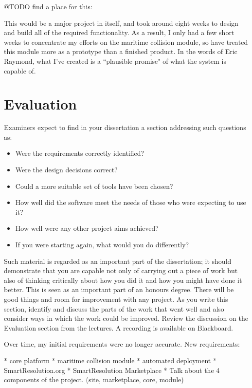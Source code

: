 @TODO find a place for this:

This would be a major project in itself, and took around eight weeks to design and build all of the required functionality. As a result, I only had a few short weeks to concentrate my efforts on the maritime collision module, so have treated this module more as a prototype than a finished product. In the words of Eric Raymond, what I've created is a ``plausible promise" of what the system is capable of.

\chapter{Evaluation}

Examiners expect to find in your dissertation a section addressing such questions as:

\begin{itemize}
   \item Were the requirements correctly identified? 
   \item Were the design decisions correct?
   \item Could a more suitable set of tools have been chosen?
   \item How well did the software meet the needs of those who were expecting to use it?
   \item How well were any other project aims achieved?
   \item If you were starting again, what would you do differently?
\end{itemize}

Such material is regarded as an important part of the dissertation; it should demonstrate that you are capable not only of carrying out a piece of work but also of thinking critically about how you did it and how you might have done it better. This is seen as an important part of an honours degree. There will be good things and room for improvement with any project. As you write this section, identify and discuss the parts of the work that went well and also consider ways in which the work could be improved. Review the discussion on the Evaluation section from the lectures. A recording is available on Blackboard. 


Over time, my initial requirements were no longer accurate. New requirements:

* core platform
* maritime collision module
* automated deployment
* SmartResolution.org
* SmartResolution Marketplace
* Talk about the 4 components of the project. (site, marketplace, core, module)

